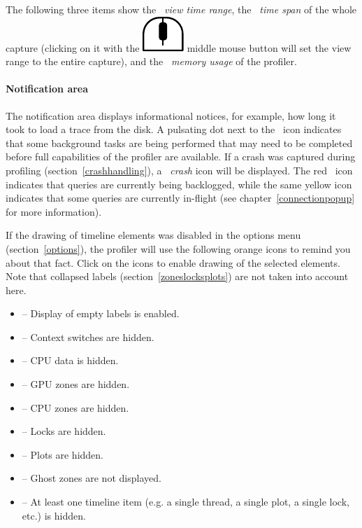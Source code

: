 \documentclass[hidelinks,titlepage,a4paper]{article}
\newcommand{\MMB}{\includegraphics[height=.8\baselineskip]{icons/mmb}}
\begin{document}
The following three items show the \emph{\faEye{}~view time range}, the \emph{\faDatabase{}~time span} of the whole capture (clicking on it with the \MMB{} middle mouse button will set the view range to the entire capture), and the \emph{\faMemory{}~memory usage} of the profiler.

\paragraph{Notification area}

The notification area displays informational notices, for example, how long it took to load a trace from the disk. A pulsating dot next to the \faTasks~icon indicates that some background tasks are being performed that may need to be completed before full capabilities of the profiler are available. If a crash was captured during profiling (section~\ref{crashhandling}), a \emph{\faSkull{}~crash} icon will be displayed. The red \faSatelliteDish{}~icon indicates that queries are currently being backlogged, while the same yellow icon indicates that some queries are currently in-flight (see chapter~\ref{connectionpopup} for more information).

If the drawing of timeline elements was disabled in the options menu (section~\ref{options}), the profiler will use the following orange icons to remind you about that fact. Click on the icons to enable drawing of the selected elements. Note that collapsed labels (section~\ref{zoneslocksplots}) are not taken into account here.

\begin{itemize}
\item \faExpand{} -- Display of empty labels is enabled.
\item \faHiking{} -- Context switches are hidden.
\item \faSlidersH{} -- CPU data is hidden.
\item \faEye{} -- GPU zones are hidden.
\item \faMicrochip{} -- CPU zones are hidden.
\item \faLock{} -- Locks are hidden.
\item \faSignature{} -- Plots are hidden.
\item \faGhost{} -- Ghost zones are not displayed.
\item \faLowVision{} -- At least one timeline item (e.g. a single thread, a single plot, a single lock, etc.) is hidden.
\end{itemize}
\end{document}
